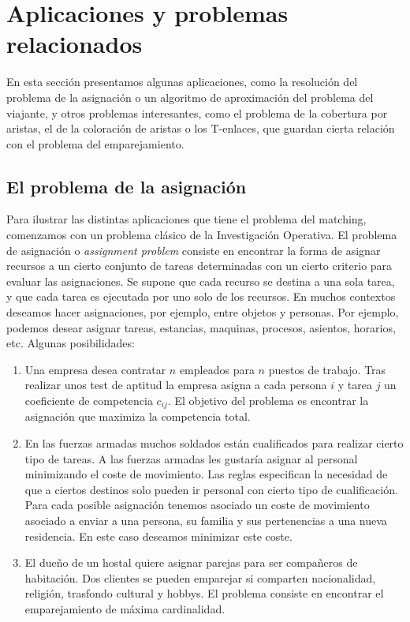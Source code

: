 \documentclass[twoside,a4paper,openright,12pt,tikz]{book}
\begin{document}
\section{Aplicaciones y problemas relacionados}
En esta sección presentamos algunas aplicaciones, como la resolución del problema de la asignación o un algoritmo de aproximación del problema del viajante, y otros problemas interesantes, como el problema de la cobertura por aristas, el de la coloración de aristas o los T-enlaces, que guardan cierta relación con el problema del emparejamiento.
\subsection{El problema de la asignación}
Para ilustrar las distintas aplicaciones que tiene el problema del matching, comenzamos con un problema clásico de la Investigación Operativa. El problema de asignación o \textit{assignment problem} consiste en encontrar la forma de asignar recursos a un cierto conjunto de tareas determinadas con un cierto criterio para evaluar las asignaciones. Se supone que cada recurso se destina a una sola tarea, y que cada tarea es ejecutada por uno solo de los recursos. En muchos contextos deseamos hacer asignaciones, por ejemplo, entre objetos y personas. Por ejemplo, podemos desear asignar tareas, estancias, maquinas, procesos, asientos, horarios, etc. Algunas posibilidades:
\begin{enumerate}
\item Una empresa desea contratar $n$ empleados para $n$ puestos de trabajo. Tras realizar unos test de aptitud la empresa asigna a cada persona $i$ y tarea $j$ un coeficiente de competencia $c_{ij}$. El objetivo del problema es encontrar la asignación que maximiza la competencia total.
\item En las fuerzas armadas muchos soldados están cualificados para realizar cierto tipo de tareas. A las fuerzas armadas les gustaría asignar al personal minimizando el coste de movimiento. Las reglas especifican la necesidad de que a ciertos destinos solo pueden ir personal con cierto tipo de cualificación. Para cada posible asignación tenemos asociado un coste de movimiento asociado a enviar a una persona, su familia y sus pertenencias a una nueva residencia. En este caso deseamos minimizar este coste.
\item El dueño de un hostal quiere asignar parejas para ser compañeros de habitación. Dos clientes se pueden emparejar si comparten nacionalidad, religión, trasfondo cultural y hobbys. El problema consiste en encontrar el emparejamiento de máxima cardinalidad.
\end{enumerate}
\end{document}
